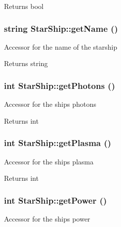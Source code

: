 \begin{DoxyReturn}{Returns}
bool 
\end{DoxyReturn}
\hypertarget{classStarShip_a822cba8f4276378a9c4cec72213e1e80}{
\subsubsection[{getName}]{\setlength{\rightskip}{0pt plus 5cm}string StarShip::getName ()}}
\label{da/d97/classStarShip_a822cba8f4276378a9c4cec72213e1e80}
Accessor for the name of the starship

\begin{DoxyReturn}{Returns}
string 
\end{DoxyReturn}
\hypertarget{classStarShip_a48df1266b1b5d8ed36ad91bc0ac8e53b}{
\subsubsection[{getPhotons}]{\setlength{\rightskip}{0pt plus 5cm}int StarShip::getPhotons ()}}
\label{da/d97/classStarShip_a48df1266b1b5d8ed36ad91bc0ac8e53b}
Accessor for the ships photons

\begin{DoxyReturn}{Returns}
int 
\end{DoxyReturn}
\hypertarget{classStarShip_a9da23f7827b3f10fb22b3b0e4cea8e52}{
\subsubsection[{getPlasma}]{\setlength{\rightskip}{0pt plus 5cm}int StarShip::getPlasma ()}}
\label{da/d97/classStarShip_a9da23f7827b3f10fb22b3b0e4cea8e52}
Accessor for the ships plasma

\begin{DoxyReturn}{Returns}
int 
\end{DoxyReturn}
\hypertarget{classStarShip_a3bdba9448b3c6096f6973abccf2eca0c}{
\subsubsection[{getPower}]{\setlength{\rightskip}{0pt plus 5cm}int StarShip::getPower ()}}
\label{da/d97/classStarShip_a3bdba9448b3c6096f6973abccf2eca0c}
Accessor for the ships power

